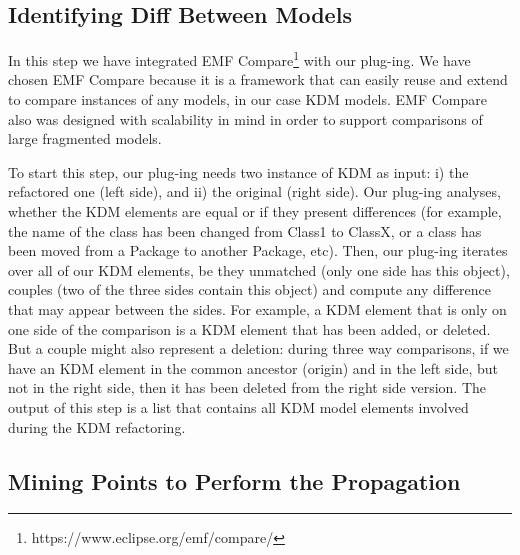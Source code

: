 
\subsection{Identifying Diff Between Models}


In this step we have integrated  EMF Compare\footnote{https://www.eclipse.org/emf/compare/} with our plug-ing. We have chosen EMF Compare because it is a framework that can easily reuse and extend to compare instances of any models, in our case KDM models. EMF Compare also was designed with scalability in mind in order to support comparisons of large fragmented models.

To start this step, our plug-ing needs two instance of KDM as input: i) the refactored one (left side), and ii) the original (right side). Our plug-ing analyses, whether the KDM elements are equal or if they present differences (for example, the name of the class has been changed from Class1 to ClassX, or a class has been moved from a Package to another Package, etc). Then, our plug-ing iterates over all of our KDM elements, be they unmatched (only one side has this object), couples (two of the three sides contain this object) and compute any difference that may appear between the sides. 
For example, a KDM element that is only on one side of the comparison is a KDM element that has been added, or deleted. But a couple might also represent a deletion: during three way comparisons, if we have an KDM element in the common ancestor (origin) and in the left side, but not in the right side, then it has been deleted from the right side version. The output of this step is a list that contains all KDM model elements involved during the KDM refactoring. 

\subsection{Mining Points to Perform the Propagation} %
\label{sub:mine_affected_metaclasses}

